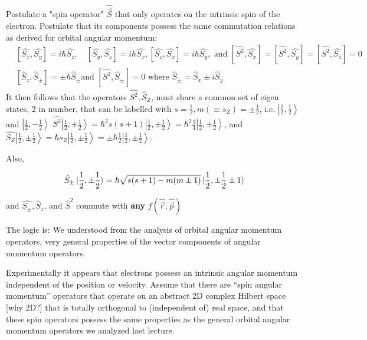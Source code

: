 \documentclass{article}
\begin{document}
Postulate a "spin operator" $\hat{\vec{S}}$ that only operates on the intrinsic spin of the electron.
Postulate that its components possess the same commutation relations as derived for orbital angular momentum:
$$
\begin{aligned}
&{\left[\widehat{S_{x}}, \widehat{S_{y}}\right]=i \hbar \widehat{S_{z}}, \quad\left[\widehat{S_{y}}, \widehat{S_{z}}\right]=i \hbar \widehat{S_{x}},\left[\widehat{S_{z}}, \widehat{S_{x}}\right]=i \hbar \widehat{S_{y}}, \text { and }\left[\widehat{S^{2}}, \widehat{S_{x}}\right]=\left[\widehat{S^{2}}, \widehat{S_{y}}\right]=\left[\widehat{S^{2}}, \widehat{S_{z}}\right]=0} \\
&{\left[\hat{S}_{z}, \hat{S}_{\pm}\right]=\pm \hbar \hat{S}_{\pm} \text {and }\left[\widehat{S^{2}}, \hat{S}_{\pm}\right]=0 \text { where } \hat{S}_{\pm}=\hat{S}_{x} \pm i \hat{S}_{y}}
\end{aligned}
$$
It then follows that the operators $\widehat{S^{2}}, \widehat{S}_{Z}$, must share a common set of eigen states, 2 in number, that can be labelled with $s=\frac{1}{2}, m\left(\equiv s_{Z}\right)=\pm \frac{1}{2}$, i.e. $\left|\frac{1}{2}, \frac{1}{2}\right\rangle$ and $\left|\frac{1}{2},-\frac{1}{2}\right\rangle$ $\widehat{S^{2}}\left|\frac{1}{2}, \pm \frac{1}{2}\right\rangle=\hbar^{2} s(s+1)\left|\frac{1}{2}, \pm \frac{1}{2}\right\rangle=\hbar^{2} \frac{3}{4}\left|\frac{1}{2}, \pm \frac{1}{2}\right\rangle$, and $\widehat{S_{Z}}\left|\frac{1}{2}, \pm \frac{1}{2}\right\rangle=\hbar s_{Z}\left|\frac{1}{2}, \pm \frac{1}{2}\right\rangle=\pm \hbar \frac{1}{2}\left|\frac{1}{2}, \pm \frac{1}{2}\right\rangle .$

Also, 

$$\hat{S}_\pm \ket{\frac{1}{2}, \pm \frac{1}{2}} = \hbar \sqrt{s(s+1) - m(m \pm 1)} \ket{\frac{1}{2}, \pm \frac{1}{2} \pm 1}$$

and $\hat{S_\pm}, \hat{S}_z$, and $\hat{S}^2$ commute with \textbf{any} $f(\hat{\vec{r}}, \hat{\vec{p}})$

The logic is:
We understood from the analysis of orbital angular momentum operators, very general properties of the vector components of angular momentum operators.  

Experimentally it appears that electrons possess an intrinsic angular momentum independent of the position or velocity.
Assume that there are “spin angular momentum” operators that operate on an abstract 2D complex Hilbert space [why 2D?] that is totally orthogonal to (independent of) real space, and that these spin operators possess the same properties as the general orbital angular momentum operators we analyzed last lecture.
\end{document}
